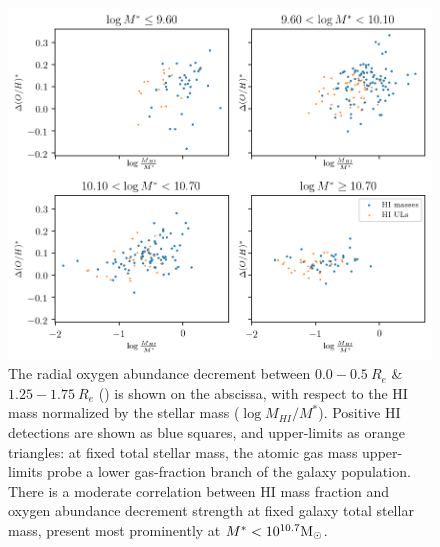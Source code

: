 \begin{figure}
    \centering
    \includegraphics[width=\textwidth]{hifrac_dec01_subplotmstar}
    \caption[The correlation between radial metallicity decrement and \hifrac, separated by total galaxy stellar mass.]{\fixspacing The radial oxygen abundance decrement between $0.0-0.5 ~ R_e$ \& $1.25-1.75 ~ R_e$ (\metdec) is shown on the abscissa, with respect to the HI mass normalized by the stellar mass ($\log M_{HI} / M^*$). Positive HI detections are shown as blue squares, and upper-limits as orange triangles: at fixed total stellar mass, the atomic gas mass upper-limits probe a lower gas-fraction branch of the galaxy population. There is a moderate correlation between HI mass fraction and oxygen abundance decrement strength at fixed galaxy total stellar mass, present most prominently at $M^* < 10^{10.7} {\rm M_{\odot}}$.}
    \label{fig:hifrac_dec01_subplotmstar}
\end{figure}

